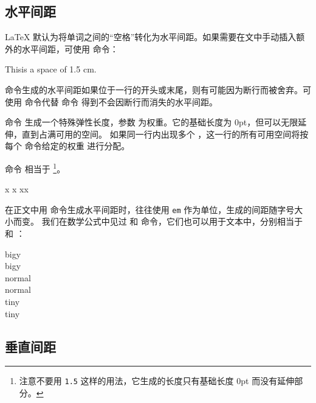 \subsection{水平间距}\label{subsec:hspace}

\LaTeX{} 默认为将单词之间的“空格”转化为水平间距。如果需要在文中手动插入额外的水平间距，可使用  命令：
\begin{example}
This\hspace{1.5cm}is a space
of 1.5 cm.
\end{example}

 命令生成的水平间距如果位于一行的开头或末尾，则有可能因为断行而被舍弃。可使用  命令代替  命令
得到不会因断行而消失的水平间距。

命令  生成一个特殊弹性长度，参数  为权重。它的基础长度为 0pt，但可以无限延伸，直到占满可用的空间。
如果同一行内出现多个 ，这一行的所有可用空间将按每个  命令给定的权重  进行分配。

命令  相当于 %
\footnote{注意不要用 \texttt{1.5} 这样的用法，它生成的长度只有基础长度 0pt 而没有延伸部分。}。

\begin{example}
x
x
x\hspace{\fill}x
\end{example}

在正文中用  命令生成水平间距时，往往使用 \texttt{em} 作为单位，生成的间距随字号大小而变。
我们在数学公式中见过  和  命令，它们也可以用于文本中，分别相当于 \marg*{1em} 和 \marg*{2em}：

\begin{example}
{\Large big\hspace{1em}y}\\
{\Large big\quad y}\\
nor\hspace{2em}mal\\
nor\qquad mal\\
{\tiny tin\hspace{1em}y}\\
{\tiny tin\quad y}
\end{example}

\subsection{垂直间距}\label{subsec:vspace}


